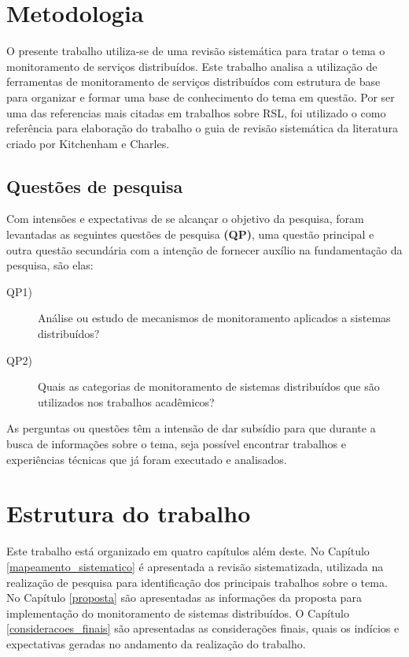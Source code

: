 \section{Metodologia}

O presente trabalho utiliza-se de uma  revisão sistemática para tratar o tema o monitoramento de serviços distribuídos. Este trabalho analisa a utilização de ferramentas de monitoramento de serviços distribuídos com estrutura de base para organizar e formar uma base de conhecimento do tema em questão. Por ser uma das referencias mais citadas em trabalhos sobre RSL, foi utilizado o como referência  para elaboração do trabalho o guia de revisão sistemática da literatura criado por Kitchenham e Charles\cite{kitchenham2007guidelines}.


\subsection{Questões de pesquisa}

Com intensões e expectativas de se alcançar o objetivo da pesquisa, foram levantadas as seguintes questões de pesquisa \textbf{(QP)}, uma questão principal e outra questão secundária com a intenção de fornecer auxílio na fundamentação da pesquisa, são elas: 

\begin{description}
		\item[QP1)] Análise ou estudo de mecanismos de monitoramento aplicados a sistemas distribuídos?
\item[QP2)] Quais as categorias de monitoramento de sistemas distribuídos que são utilizados nos trabalhos acadêmicos?
\end{description}

As perguntas ou questões têm a intensão de dar subsídio para que durante a busca de informações sobre o tema, seja possível encontrar trabalhos e experiências técnicas que já foram executado e analisados\cite{feltrim2004abordagem}.


\section{Estrutura do trabalho}

Este trabalho está organizado em quatro capítulos além deste. No Capítulo \ref{mapeamento_sistematico} é apresentada a revisão sistematizada, utilizada na realização de pesquisa para identificação dos principais trabalhos sobre o tema. No Capítulo \ref{proposta} são apresentadas as informações da proposta para implementação do monitoramento de sistemas distribuídos. O Capítulo \ref{consideracoes_finais} são apresentadas as considerações finais, quais os indícios e expectativas geradas no andamento da realização do trabalho.